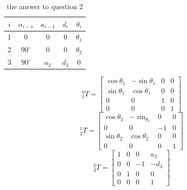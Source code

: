 \documentclass{article}
\begin{document}
\begin{table}[t]
\centering
\begin{tabular}{|c|c|c|c|c|}
\hline
$i$ & $\alpha_{i-1}$ & $a_{i-1}$ & $d_{i}$ & $\theta_{i}$ \\ \hline
1  & 0  & 0  & 0  & $\theta_{1}$  \\ \hline
2  & $90^\circ$  & 0  & 0  & $\theta_{2}$  \\ \hline
3  & $90^\circ$  & $a_{2}$  & $d_{3}$  & 0  \\ \hline
\end{tabular}
\caption{the answer to question 2}
\label{tab:mytable}
\end{table}

\begin{enumerate}
    \[
        {}^{0}_{1}T = 
        \begin{bmatrix}
            \cos{\theta_{1}} & -\sin{\theta_{1}} & 0 & 0 \\
            \sin{\theta_{1}} & \cos{\theta_{1}} & 0 & 0 \\
            0 & 0 & 1 & 0 \\
            0 & 0 & 0 & 1
        \end{bmatrix}
    \]
    \[
        {}^{1}_{2}T = 
        \begin{bmatrix}
            \cos{\theta_{2}} & -\sin_{\theta_{2}} & 0 & 0 \\
            0 & 0 & -1 & 0 \\
            \sin{\theta_{2}} & \cos{\theta_{2}} & 0 & 0 \\
            0 & 0 & 0 & 1
        \end{bmatrix}
    \]
    \[
        {}^{2}_{3}T = 
        \begin{bmatrix}
            1 & 0 & 0 & a_{2} \\
            0 & 0 & -1 & -d_{3} \\
            0 & 1 & 0 & 0 \\
            0 & 0 & 0 & 1
        \end{bmatrix}
    \]


\end{enumerate}
\end{document}
